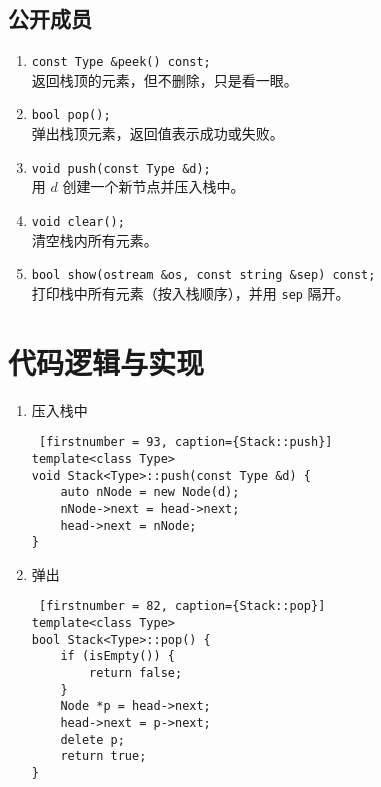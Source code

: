 {
\subsection{公开成员}
\begin{enumerate}
    \item \lstinline{const Type &peek() const;}\\
          返回栈顶的元素，但不删除，只是{\kaishu 看一眼}。
    \item \lstinline{bool pop();} \\
          弹出栈顶元素，返回值表示成功或失败。
    \item \lstinline{void push(const Type &d);} \\
          用 $d$ 创建一个新节点并压入栈中。
    \item \lstinline{void clear();} \\
          清空栈内所有元素。
    \item \lstinline{bool show(ostream &os, const string &sep) const;} \\
          打印栈中所有元素（按入栈顺序），并用 \lstinline{sep} 隔开。
\end{enumerate}

}

\section{代码逻辑与实现}


{
\begin{enumerate}
      \item 压入栈中
\begin{lstlisting} [firstnumber = 93, caption={Stack::push}]
template<class Type>
void Stack<Type>::push(const Type &d) {
    auto nNode = new Node(d);
    nNode->next = head->next;
    head->next = nNode;
} \end{lstlisting}
      \item 弹出
\begin{lstlisting} [firstnumber = 82, caption={Stack::pop}]
template<class Type>
bool Stack<Type>::pop() {
    if (isEmpty()) {
        return false;
    }
    Node *p = head->next;
    head->next = p->next;
    delete p;
    return true;
}\end{lstlisting}
       
\end{enumerate}
}

